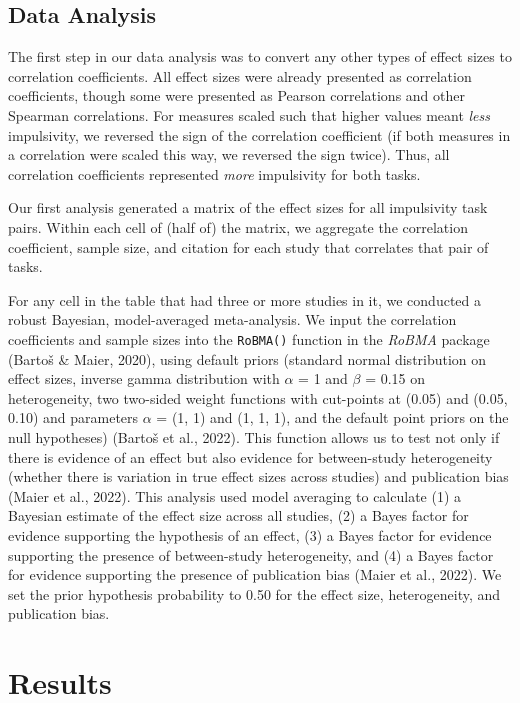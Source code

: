\documentclass[
  ,pub,floatsintext]{apa6}
\begin{document}
\hypertarget{data-analysis}{%
\subsection{Data Analysis}\label{data-analysis}}

The first step in our data analysis was to convert any other types of effect sizes to correlation coefficients. All effect sizes were already presented as correlation coefficients, though some were presented as Pearson correlations and other Spearman correlations. For measures scaled such that higher values meant \emph{less} impulsivity, we reversed the sign of the correlation coefficient (if both measures in a correlation were scaled this way, we reversed the sign twice). Thus, all correlation coefficients represented \emph{more} impulsivity for both tasks.

Our first analysis generated a matrix of the effect sizes for all impulsivity task pairs. Within each cell of (half of) the matrix, we aggregate the correlation coefficient, sample size, and citation for each study that correlates that pair of tasks.

For any cell in the table that had three or more studies in it, we conducted a robust Bayesian, model-averaged meta-analysis. We input the correlation coefficients and sample sizes into the \texttt{RoBMA()} function in the \emph{RoBMA} package (Bartoš \& Maier, 2020), using default priors (standard normal distribution on effect sizes, inverse gamma distribution with \(\alpha\) = 1 and \(\beta\) = 0.15 on heterogeneity, two two-sided weight functions with cut-points at (0.05) and (0.05, 0.10) and parameters \(\alpha\) = (1, 1) and (1, 1, 1), and the default point priors on the null hypotheses) (Bartoš et al., 2022). This function allows us to test not only if there is evidence of an effect but also evidence for between-study heterogeneity (whether there is variation in true effect sizes across studies) and publication bias (Maier et al., 2022). This analysis used model averaging to calculate (1) a Bayesian estimate of the effect size across all studies, (2) a Bayes factor for evidence supporting the hypothesis of an effect, (3) a Bayes factor for evidence supporting the presence of between-study heterogeneity, and (4) a Bayes factor for evidence supporting the presence of publication bias (Maier et al., 2022). We set the prior hypothesis probability to 0.50 for the effect size, heterogeneity, and publication bias.

\hypertarget{results}{%
\section{Results}\label{results}}
\end{document}
